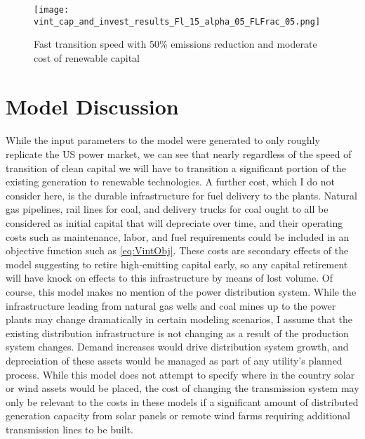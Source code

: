 \documentclass{article}
\begin{document}
\begin{figure}[h]
\texttt{[image: vint\_cap\_and\_invest\_results\_Fl\_15\_alpha\_05\_FLFrac\_05.png]}
\caption{Fast transition speed with 50\% emissions reduction and moderate cost of renewable capital\label{fig:VintResultsFl=15_Alpha50_Frac50}}
\end{figure}




\section{Model Discussion}

\paragraph{} While the input parameters to the model were generated to only roughly replicate the US power market, we can see that nearly regardless of the speed of transition of clean capital we will have to transition a significant portion of the existing generation to renewable technologies. A further cost, which I do not consider here, is the durable infrastructure for fuel delivery to the plants. Natural gas pipelines, rail lines for coal, and delivery trucks for coal ought to all be considered as initial capital that will depreciate over time, and their operating costs such as maintenance, labor, and fuel requirements could be included in an objective function such as \ref{eq:VintObj}. These costs are secondary effects of the model suggesting to retire high-emitting capital early, so any capital retirement will have knock on effects to this infrastructure by means of lost volume. Of course, this model makes no mention of the power distribution system. While the infrastructure leading from natural gas wells and coal mines up to the power plants may change dramatically in certain modeling scenarios, I assume that the existing distribution infrastructure is not changing as a result of the production system changes. Demand increases would drive distribution system growth, and depreciation of these assets would be managed as part of any utility's planned process. While this model does not attempt to specify where in the country solar or wind assets would be placed, the cost of changing the transmission system may only be relevant to the costs in these models if a significant amount of distributed generation capacity from solar panels or remote wind farms requiring additional transmission lines to be built. 
\end{document}
